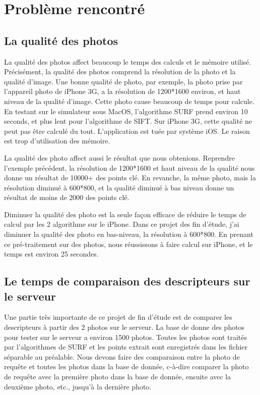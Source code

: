 ﻿\section{Problème rencontré}
\subsection{La qualité des photos} %
\label{sub:la_qualité_des_photos}

La qualité des photos affect beaucoup le temps des calculs et le mémoire utilisé. Précisément, la qualité des photos comprend la résolution de la photo et la qualité d'image. Une bonne qualité de photo, par exemple, la photo prise par l'appareil photo de iPhone 3G, a la résolution de 1200*1600 environ, et haut niveau de la qualité d'image. Cette photo cause beaucoup de temps pour calcule. En testant sur le simulateur sous MacOS, l'algorithme SURF prend environ 10 seconds, et plus lent pour l'algorithme de SIFT. Sur iPhone 3G, cette qualité ne peut pas être calculé du tout. L'application est tuée par système iOS. Le raison est trop d'utilisation des mémoire. 

La qualité des photo affect aussi le résultat que nous obtenions. Reprendre l'exemple précédent, la résolution de 1200*1600 et haut niveau de la qualité nous donne un résultat de 10000+ des points clé. En revanche, la même photo, mais la résolution diminué à 600*800, et la qualité diminué à bas niveau donne un résultat de moins de 2000 des points clé.

Diminuer la qualité des photo est la seule façon efficace de réduire le temps de calcul par les 2 algorithme sur le iPhone. Dans ce projet des fin d'étude, j'ai diminuer la qualité des photo en bas-niveau, la résolution à 600*800. En prenant ce pré-traitement sur des photos, nous réussissons à faire calcul sur iPhone, et le temps est environ 25 secondes. 



\subsection{Le temps de comparaison des descripteurs sur le serveur} %
\label{sub:le_temps_de_comparaison_des_descripteurs_sur_le_serveur}

Une partie très importante de ce projet de fin d'étude est de comparer les descripteurs à partir des 2 photos sur le serveur. La base de donne des photos pour tester sur le serveur a environ 1500 photos. Toutes les photos sont traités par l'algorithmes de SURF et les points extrait sont enregistrés dans les fichier séparable au préalable. Nous devons faire des comparaison entre la photo de requête et toutes les photos dans la base de donnée, c-à-dire comparer la photo de requête avec la première photo dans la base de donnée, ensuite avec la deuxième photo, etc., jusqu'à la dernière photo.

